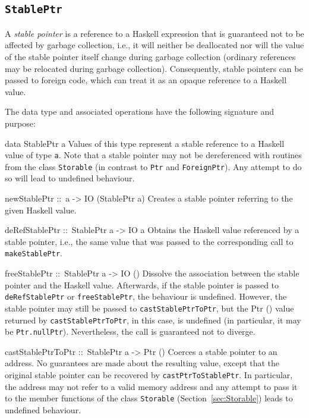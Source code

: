 \documentclass[a4paper,twosides]{article}
\makeatletter
\newcommand{\code}[1]{\texttt{#1}}      %
\newenvironment{codedesc}{%
  \list{}{\labelwidth\z@
    \let\makelabel\codedesclabel}
  }{%
  \endlist
  }
\newcommand*{\codedesclabel}[1]{%
  \hspace{-\leftmargin}
  \parbox[b]{\labelwidth}{\makebox[0pt][l]{\code{#1}}\\}\hfil\relax
  }
\makeatother
\begin{document}
\subsection{\code{StablePtr}}
\label{sec:StablePtr}

A \emph{stable pointer} is a reference to a Haskell expression that is
guaranteed not to be affected by garbage collection, i.e., it will neither be
deallocated nor will the value of the stable pointer itself change during
garbage collection (ordinary references may be relocated during garbage
collection).  Consequently, stable pointers can be passed to foreign code,
which can treat it as an opaque reference to a Haskell value.

The data type and associated operations have the following signature and
purpose:
%
\begin{codedesc}
\item[data StablePtr a] Values of this type represent a stable reference to a
  Haskell value of type \code{a}.  Note that a stable pointer may not be
  dereferenced with routines from the class \code{Storable} (in contrast to
  \code{Ptr} and \code{ForeignPtr}).  Any attempt to do so will lead to
  undefined behaviour.
  
\item[newStablePtr ::\ a -> IO (StablePtr a)] Creates a stable pointer
  referring to the given Haskell value.
  
\item[deRefStablePtr ::\ StablePtr a -> IO a] Obtains the Haskell value
  referenced by a stable pointer, i.e., the same value that was passed to the
  corresponding call to \code{makeStablePtr}.
  
\item[freeStablePtr ::\ StablePtr a -> IO ()] Dissolve the association between
  the stable pointer and the Haskell value. Afterwards, if the stable pointer
  is passed to \code{deRefStablePtr} or \code{freeStablePtr}, the behaviour is
  undefined.  However, the stable pointer may still be passed to
  \code{castStablePtrToPtr}, but the Ptr () value returned by
  \code{castStablePtrToPtr}, in this case, is undefined (in particular, it may
  be \code{Ptr.nullPtr}).  Nevertheless, the call is guaranteed not to
  diverge.
  
\item[castStablePtrToPtr ::\ StablePtr a -> Ptr ()] Coerces a stable pointer
  to an address. No guarantees are made about the resulting value, except that
  the original stable pointer can be recovered by \code{castPtrToStablePtr}.
  In particular, the address may not refer to a valid memory address and any
  attempt to pass it to the member functions of the class \code{Storable}
  (Section~\ref{sec:Storable}) leads to undefined behaviour.
  

\end{codedesc}
\end{document}
